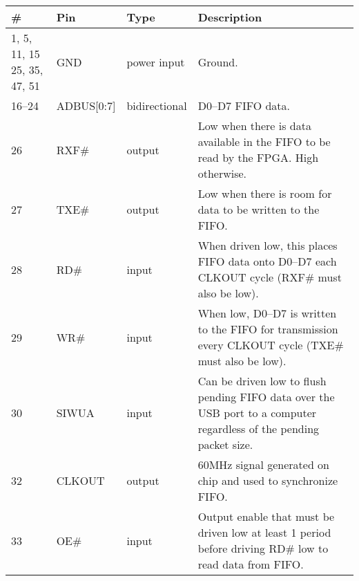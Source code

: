 \label{tab:ft2232h-pinout}
\begin{tabularx}{\textwidth}{l l l X}
        \caption{FT2232H pinout.} \\
        \toprule
        \# & Pin & Type & Description \\
        \midrule

        1, 5, 11, 15 25, 35, 47, 51 & GND        & power input   & Ground.                                                        \\
        16--24                      & ADBUS[0:7] & bidirectional & D0--D7 FIFO data.                                              \\
        26                          & RXF\#      & output        & Low when there is data available in the FIFO to be read by the
        FPGA\@. High otherwise.                                                                                                   \\
        27                          & TXE\#      & output        & Low when there is room for data
        to be written to the FIFO\@.                                                                                              \\
        28                          & RD\#       & input         & When driven low, this places FIFO data onto D0--D7 each CLKOUT cycle
        (RXF\# must also be low).                                                                                                 \\
        29                          & WR\#       & input         & When low, D0--D7 is written to the FIFO for transmission every CLKOUT
        cycle (TXE\# must also be low).                                                                                           \\
        30                          & SIWUA      & input         & Can be driven low to flush pending FIFO data over the USB port to a
        computer regardless of the pending packet size.                                                                           \\
        32                          & CLKOUT     & output        & 60MHz signal generated on chip and used to synchronize FIFO\@. \\
        33                          & OE\#       & input         & Output enable that must be driven low at least 1 period before driving
        RD\# low to read data from FIFO\@.                                                                                        \\

        \bottomrule
\end{tabularx}

